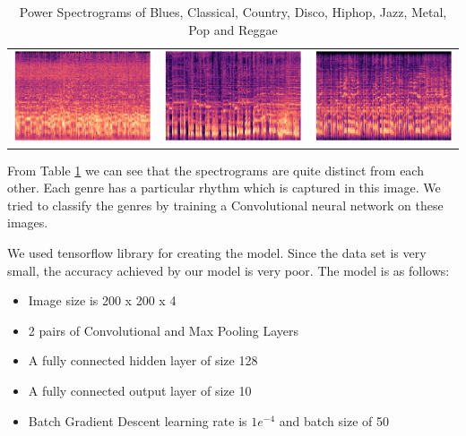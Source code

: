 \documentclass[a4paper,10pt]{article}
\begin{document}
\begin{table}[!ht]
\begin{tabular}{ccc}
        \includegraphics[scale=0.3]{metal.png} &  \includegraphics[scale=0.3]{pop.png} & \includegraphics[scale=0.3]{reggae.png}\\ 
    \end{tabular}
    \caption{Power Spectrograms of Blues, Classical, Country, Disco, Hiphop, Jazz, Metal, Pop and Reggae}
    \label{tab:spectrograms}
\end{table}

From Table \ref{tab:spectrograms} we can see that the spectrograms are quite distinct from each other. Each genre has a particular rhythm which is captured in this image. We tried to classify the genres by training a Convolutional neural network on these images.

We used tensorflow library for creating the model. Since the data set is very small, the accuracy achieved by our model is very poor. The model is as follows:
\begin{itemize}
    \item Image size is 200 x 200 x 4
    \item 2 pairs of Convolutional and Max Pooling Layers
    \item A fully connected hidden layer of size 128
    \item A fully connected output layer of size 10
    \item Batch Gradient Descent learning rate is $1e^{-4}$ and batch size of 50
\end{itemize}
\end{document}
